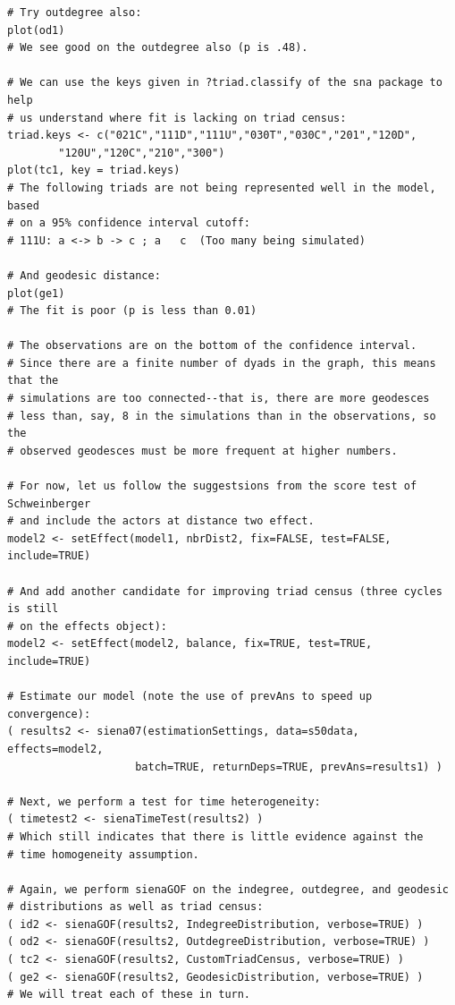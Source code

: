 \documentclass[a4paper,fleqn,11pt]{article}
\newcommand{\+}{\, + \,}
\begin{document}
{\begin{footnotesize}
\begin{verbatim}
# Try outdegree also:
plot(od1)
# We see good on the outdegree also (p is .48).

# We can use the keys given in ?triad.classify of the sna package to help
# us understand where fit is lacking on triad census:
triad.keys <- c("021C","111D","111U","030T","030C","201","120D",
		"120U","120C","210","300")
plot(tc1, key = triad.keys)
# The following triads are not being represented well in the model, based
# on a 95% confidence interval cutoff:
# 111U: a <-> b -> c ; a   c  (Too many being simulated)

# And geodesic distance:
plot(ge1)
# The fit is poor (p is less than 0.01)

# The observations are on the bottom of the confidence interval.
# Since there are a finite number of dyads in the graph, this means that the
# simulations are too connected--that is, there are more geodesces
# less than, say, 8 in the simulations than in the observations, so the
# observed geodesces must be more frequent at higher numbers.

# For now, let us follow the suggestsions from the score test of Schweinberger
# and include the actors at distance two effect.
model2 <- setEffect(model1, nbrDist2, fix=FALSE, test=FALSE, include=TRUE)

# And add another candidate for improving triad census (three cycles is still
# on the effects object):
model2 <- setEffect(model2, balance, fix=TRUE, test=TRUE, include=TRUE)

# Estimate our model (note the use of prevAns to speed up convergence):
( results2 <- siena07(estimationSettings, data=s50data, effects=model2,
					batch=TRUE, returnDeps=TRUE, prevAns=results1) )

# Next, we perform a test for time heterogeneity:
( timetest2 <- sienaTimeTest(results2) )
# Which still indicates that there is little evidence against the
# time homogeneity assumption.

# Again, we perform sienaGOF on the indegree, outdegree, and geodesic
# distributions as well as triad census:
( id2 <- sienaGOF(results2, IndegreeDistribution, verbose=TRUE) )
( od2 <- sienaGOF(results2, OutdegreeDistribution, verbose=TRUE) )
( tc2 <- sienaGOF(results2, CustomTriadCensus, verbose=TRUE) )
( ge2 <- sienaGOF(results2, GeodesicDistribution, verbose=TRUE) )
# We will treat each of these in turn.


\end{verbatim}
\end{footnotesize}}
\end{document}
